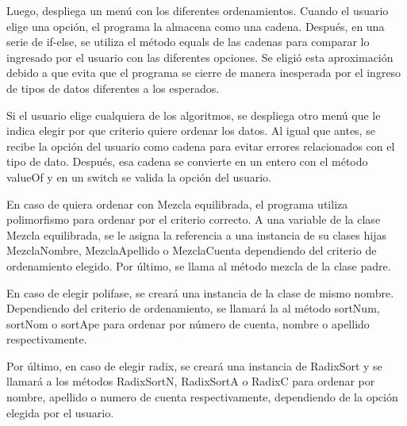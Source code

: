 \documentclass[11pt]{article}
\begin{document}
 Luego, despliega un menú con los diferentes ordenamientos. Cuando el usuario elige una opción, el programa la almacena como una cadena. Después, en una serie de if-else, se utiliza el método equals de las cadenas para comparar lo ingresado por el usuario con las diferentes opciones. Se eligió esta aproximación debido a que evita que el programa se cierre de manera inesperada por el ingreso de tipos de datos diferentes a los esperados.
\par
Si el usuario elige cualquiera de los algoritmos, se despliega otro menú que le indica elegir por que criterio quiere ordenar los datos. Al igual que antes, se recibe la opción del usuario como cadena para evitar errores relacionados con el tipo de dato. Después, esa cadena se convierte en un entero con el método valueOf y en un switch se valida la opción del usuario. 
\par
En caso de quiera ordenar con Mezcla equilibrada, el programa utiliza polimorfismo para ordenar por el criterio correcto. A una variable de la clase Mezcla equilibrada, se le asigna la referencia a una instancia de su clases hijas MezclaNombre, MezclaApellido o MezclaCuenta dependiendo del criterio de ordenamiento elegido. Por último, se llama al método mezcla de la clase padre.
\par
En caso de elegir polifase, se creará una instancia de la clase de mismo nombre. Dependiendo del criterio de ordenamiento, se llamará la al método sortNum, sortNom o sortApe para ordenar por número de cuenta, nombre o apellido respectivamente.
\par
Por último, en caso de elegir radix, se creará una instancia de RadixSort y se llamará a los métodos RadixSortN, RadixSortA o RadixC para ordenar por nombre, apellido o numero de cuenta respectivamente, dependiendo de la opción elegida por el usuario.
     
\end{document}
